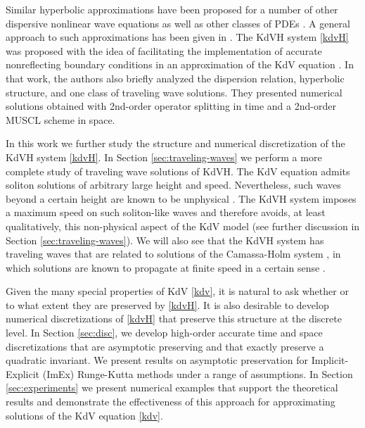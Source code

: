 \documentclass{article}
\begin{document}
Similar hyperbolic approximations have been proposed for a number of other dispersive
nonlinear wave equations
\cite{antuono2009dispersive,grosso2010dispersive,mazaheri2016first,favrie2017rapid,
dhaouadi2019extended,escalante2019efficient,chesnokov2019hyperbolic,bassi2020hyperbolic,
gavrilyuk2022hyperbolic,chesnokov2023strongly}
as well as other classes of PDEs
\cite{toro2014advection,ruter2018hyperbolic,li2018new,dhaouadi2022hyperbolic,dhaouadi2022first,gavrilyuk2024conduit}.
A general approach to such approximations has been given in \cite{ketcheson2024approximation}.
The KdVH system \eqref{kdvH} was proposed with the idea of facilitating
the implementation of accurate nonreflecting boundary conditions in an approximation of
the KdV equation \cite{besse2022perfectly}.  In that work, the authors also briefly analyzed the
dispersion relation, hyperbolic structure, and one class of traveling wave solutions.
They presented numerical solutions obtained with 2nd-order operator splitting in
time and a 2nd-order MUSCL scheme in space.

In this work we further study the structure and numerical discretization of
the KdVH system \eqref{kdvH}.
In Section \ref{sec:traveling-waves} we perform a more complete study of traveling wave
solutions of KdVH.
The KdV equation admits soliton solutions of arbitrary large height and
speed.  Nevertheless, such waves beyond a certain height are known to be unphysical
\cite{brun2018convective}.  The KdVH system imposes a maximum speed
on such soliton-like waves and therefore avoids, at least qualitatively,
this non-physical aspect of the KdV model (see further discussion in Section \ref{sec:traveling-waves}).
We will also see that the KdVH system has traveling waves that are related to solutions
of the Camassa-Holm system \cite{camassa1994new}, in which solutions are known
to propagate at finite speed in a certain sense \cite{constantin2005finite}.

Given the many special properties of KdV \eqref{kdv}, it is natural to ask whether
or to what extent they are preserved by \eqref{kdvH}.  It is also desirable to
develop numerical discretizations of \eqref{kdvH} that preserve this structure
at the discrete level.  In Section \ref{sec:disc}, we develop high-order
accurate time and space discretizations that are asymptotic preserving and that
exactly preserve a quadratic invariant.
We present results on asymptotic preservation for Implicit-Explicit (ImEx) Runge-Kutta methods
under a range of assumptions.  In Section \ref{sec:experiments} we present
numerical examples that support the theoretical results and demonstrate the
effectiveness of this approach for approximating solutions of the KdV equation
\eqref{kdv}.
\end{document}
